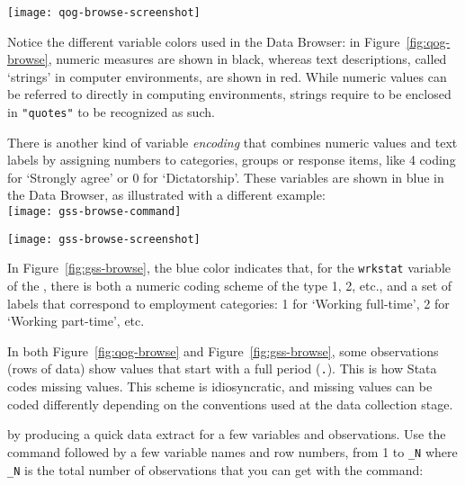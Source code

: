 		\begin{figure*}[h]
			\texttt{[image: qog-browse-screenshot]}%
		  \caption{The Stata Data Browser, showing \QOG data.}%
		  \label{fig:qog-browse}%
		\end{figure*}

	Notice the different variable colors used in the Data Browser: in Figure~\ref{fig:qog-browse}, numeric measures are shown in black, whereas text descriptions, called `strings' in computer environments, are shown in red. While numeric values can be referred to directly in computing environments, strings require to be enclosed in \texttt{"quotes"} to be recognized as such.%
		
	There is another kind of variable \emph{encoding} that combines numeric values and text labels by assigning numbers to categories, groups or response items, like 4 coding for `Strongly agree' or 0 for `Dictatorship'. These variables are shown in blue in the Data Browser, as illustrated with a different example:\\[1em]%

		\texttt{[image: gss-browse-command]}\\[1em]%
		\begin{figure*}[h]
			\texttt{[image: gss-browse-screenshot]}%
		  \caption{The Data Editor in Browse (read-only) mode, showing \GSS data.}%
		  \label{fig:gss-browse}%
		\end{figure*}

	In Figure~\ref{fig:gss-browse}, the blue color indicates that, for the \texttt{wrkstat} variable of the \gss, there is both a numeric coding scheme of the type 1, 2, etc., and a set of labels that correspond to employment categories: 1 for `Working full-time', 2 for `Working part-time', etc.%

	In both Figure~\ref{fig:qog-browse} and Figure~\ref{fig:gss-browse}, some observations (rows of data) show values that start with a full period (\texttt{.}). This is how Stata codes missing values. This scheme is idiosyncratic, and missing values can be coded differently depending on the conventions used at the data collection stage.%

	 by producing a quick data extract for a few variables and observations. Use the  command followed by a few variable names and row numbers, from 1 to \texttt{\_N} where \texttt{\_N} is the total number of observations that you can get with the  command:%

